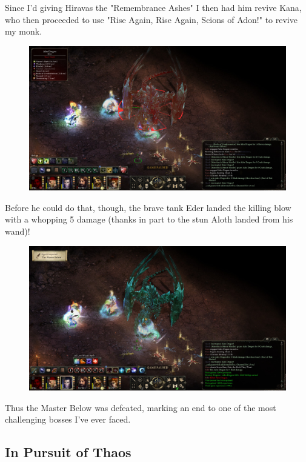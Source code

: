\documentclass{article}
\begin{document}
Since I'd giving Hiravas the "Remembrance Ashes" I then had him revive Kana, who then proceeded to use "Rise Again, Rise Again, Scions of Adon!" to revive my monk.

\begin{figure}
\includegraphics[scale=0.33]{files/blog/2019_03_17_pillars_of_eternity_path_of_the_damned_act_iv/2019_03_17_dragon2_13.jpg}
\end{figure}

Before he could do that, though, the brave tank Eder landed the killing blow with a whopping 5 damage (thanks in part to the stun Aloth landed from his wand)!

\begin{figure}
\includegraphics[scale=0.33]{files/blog/2019_03_17_pillars_of_eternity_path_of_the_damned_act_iv/2019_03_17_dragon2_14.jpg}
\end{figure}

Thus the Master Below was defeated, marking an end to one of the most challenging bosses I've ever faced.

\subsection{In Pursuit of Thaos}
\end{document}
